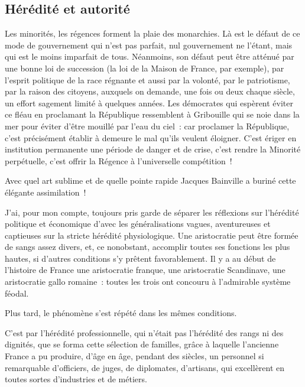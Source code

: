 \documentclass[french,twoside]{book} %
\newcommand{\astermono}{\medskip\centerline{\color{rubric}\large\selectfont{\syms ✻}}\medskip\par}%
\begin{document}
\subsection[Hérédité et autorité]{Hérédité et autorité}
\noindent Les minorités, les régences forment la plaie des monarchies. Là est le défaut de ce mode de gouvernement qui n’est pas parfait, nul gouvernement ne l’étant, mais qui est le moins imparfait de tous. Néanmoins, son défaut peut être atténué par une bonne loi de succession (la loi de la Maison de France, par exemple), par l’esprit politique de la race régnante et aussi par la volonté, par le patriotisme, par la raison des citoyens, auxquels on demande, une fois ou deux chaque siècle, un effort sagement limité à quelques années. Les démocrates qui espèrent éviter ce fléau en proclamant la République ressemblent à Gribouille qui se noie dans la mer pour éviter d’être mouillé par l’eau du ciel : car proclamer la République, c’est précisément établir à demeure le mal qu’ils veulent éloigner. C’est ériger en institution permanente une période de danger et de crise, c’est rendre la Minorité perpétuelle, c’est offrir la Régence à l’universelle compétition !\par
Avec quel art sublime et de quelle pointe rapide Jacques Bainville a buriné cette élégante assimilation !\par

\astermono

\noindent J’ai, pour mon compte, toujours pris garde de séparer les réflexions sur l’hérédité politique et économique d’avec les généralisations vagues, aventureuses et captieuses sur la stricte hérédité physiologique. Une aristocratie peut être formée de sangs assez divers, et, ce nonobstant, accomplir toutes ses fonctions les plus hautes, si d’autres conditions s’y prêtent favorablement. Il y a au début de l’histoire de France une aristocratie franque, une aristocratie Scandinave, une aristocratie gallo romaine : toutes les trois ont concouru à l’admirable système féodal.\par
Plus tard, le phénomène s’est répété dans les mêmes conditions.\par
C’est par l’hérédité professionnelle, qui n’était pas l’hérédité des rangs ni des dignités, que se forma cette sélection de familles, grâce à laquelle l’ancienne France a pu produire, d’âge en âge, pendant des siècles, un personnel si remarquable d’officiers, de juges, de diplomates, d’artisans, qui excellèrent en toutes sortes d’industries et de métiers.\par
\end{document}
